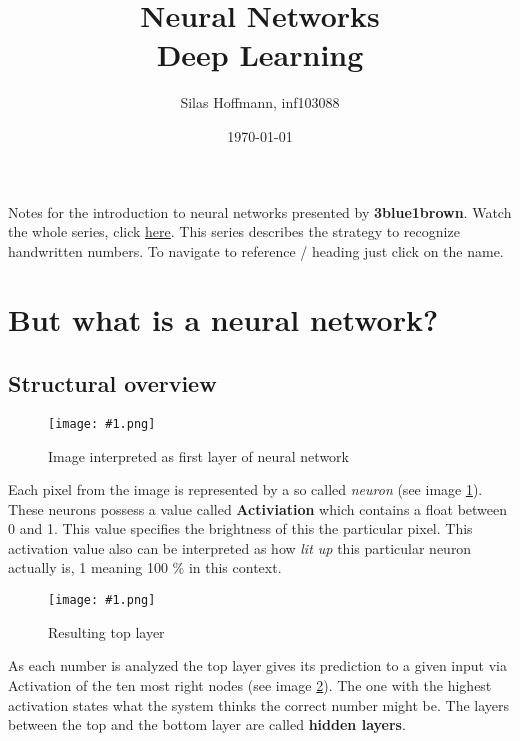 \documentclass{article}
\title{%
Neural Networks \\
\large Deep Learning}
\author{Silas Hoffmann, inf103088}
\date{\today}
\newcommand{\lbl}[1]{(see image \ref{#1})}
\newcommand{\img}[1]{
	\centering
	\texttt{[image: \#1.png]}
	\label{#1}
}
\begin{document}
\maketitle

\vspace{0.5cm}
\tableofcontents
\vspace{1cm}

Notes for the introduction to neural networks presented by \textbf{3blue1brown}. Watch the whole series, click \href{https://www.youtube.com/watch?v=aircAruvnKk}{\color{blue} {here}}. This series describes the strategy to recognize handwritten numbers. To navigate to reference / heading just click on the name.

\listoffigures

\clearpage

\section{But what is a neural network?}


\subsection{Structural overview}

\FloatBarrier

\begin{figure}[h]
\img{ai_1}
\caption{Image interpreted as first layer of neural network}
\end{figure}

Each pixel from the image is represented by a so called \textit{neuron} \lbl{ai_1}. These neurons possess a value called \textbf{Activiation} which contains a float between 0 and 1. This value specifies the brightness of this the particular pixel. This activation value also can be interpreted as how \textit{lit up} this particular neuron actually is, 1 meaning 100 \% in this context.


\begin{figure}[b!]
\img{ai_2}
\caption{Resulting top layer}
\end{figure}

As each number is analyzed the top layer gives its prediction to a given input via Activation of the ten most right nodes \lbl{ai_2}. The one with the highest activation states what the system thinks the correct number might be. The layers between the top and the bottom layer are called \textbf{hidden layers}. 
\end{document}

